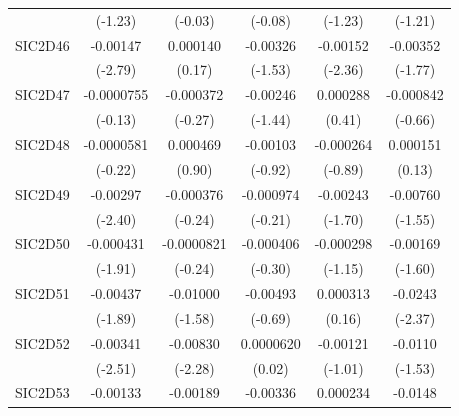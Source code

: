 \begin{table}[htbp]
\begin{tabular}{l*{5}{c}}
            &     (-1.23)         &     (-0.03)         &     (-0.08)         &     (-1.23)         &     (-1.21)         \\
SIC2D46     &    -0.00147\sym{**} &    0.000140         &    -0.00326         &    -0.00152\sym{*}  &    -0.00352         \\
            &     (-2.79)         &      (0.17)         &     (-1.53)         &     (-2.36)         &     (-1.77)         \\
SIC2D47     &  -0.0000755         &   -0.000372         &    -0.00246         &    0.000288         &   -0.000842         \\
            &     (-0.13)         &     (-0.27)         &     (-1.44)         &      (0.41)         &     (-0.66)         \\
SIC2D48     &  -0.0000581         &    0.000469         &    -0.00103         &   -0.000264         &    0.000151         \\
            &     (-0.22)         &      (0.90)         &     (-0.92)         &     (-0.89)         &      (0.13)         \\
SIC2D49     &    -0.00297\sym{*}  &   -0.000376         &   -0.000974         &    -0.00243         &    -0.00760         \\
            &     (-2.40)         &     (-0.24)         &     (-0.21)         &     (-1.70)         &     (-1.55)         \\
SIC2D50     &   -0.000431         &  -0.0000821         &   -0.000406         &   -0.000298         &    -0.00169         \\
            &     (-1.91)         &     (-0.24)         &     (-0.30)         &     (-1.15)         &     (-1.60)         \\
SIC2D51     &    -0.00437         &    -0.01000         &    -0.00493         &    0.000313         &     -0.0243\sym{*}  \\
            &     (-1.89)         &     (-1.58)         &     (-0.69)         &      (0.16)         &     (-2.37)         \\
SIC2D52     &    -0.00341\sym{*}  &    -0.00830\sym{*}  &   0.0000620         &    -0.00121         &     -0.0110         \\
            &     (-2.51)         &     (-2.28)         &      (0.02)         &     (-1.01)         &     (-1.53)         \\
SIC2D53     &    -0.00133         &    -0.00189         &    -0.00336         &    0.000234         &     -0.0148         \\

\end{tabular}
\end{table}
